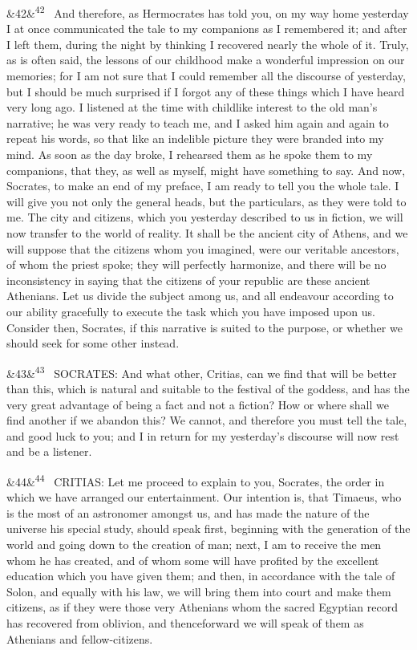 \documentclass[12pt]{article}
\newcommand{\para}[1][]{\par\noindent\ifx&#1&\else\textsuperscript{\footnotesize #1}~\fi}
\begin{document}
\para[42] And therefore, as Hermocrates has told you, on my way home yesterday I at once communicated the tale to my companions as I remembered it; and after I left them, during the night by thinking I recovered nearly the whole of it. Truly, as is often said, the lessons of our childhood make a wonderful impression on our memories; for I am not sure that I could remember all the discourse of yesterday, but I should be much surprised if I forgot any of these things which I have heard very long ago. I listened at the time with childlike interest to the old man's narrative; he was very ready to teach me, and I asked him again and again to repeat his words, so that like an indelible picture they were branded into my mind. As soon as the day broke, I rehearsed them as he spoke them to my companions, that they, as well as myself, might have something to say. And now, Socrates, to make an end of my preface, I am ready to tell you the whole tale. I will give you not only the general heads, but the particulars, as they were told to me. The city and citizens, which you yesterday described to us in fiction, we will now transfer to the world of reality. It shall be the ancient city of Athens, and we will suppose that the citizens whom you imagined, were our veritable ancestors, of whom the priest spoke; they will perfectly harmonize, and there will be no inconsistency in saying that the citizens of your republic are these ancient Athenians. Let us divide the subject among us, and all endeavour according to our ability gracefully to execute the task which you have imposed upon us. Consider then, Socrates, if this narrative is suited to the purpose, or whether we should seek for some other instead.

\para[43] SOCRATES: And what other, Critias, can we find that will be better than this, which is natural and suitable to the festival of the goddess, and has the very great advantage of being a fact and not a fiction? How or where shall we find another if we abandon this? We cannot, and therefore you must tell the tale, and good luck to you; and I in return for my yesterday's discourse will now rest and be a listener.

\para[44] CRITIAS: Let me proceed to explain to you, Socrates, the order in which we have arranged our entertainment. Our intention is, that Timaeus, who is the most of an astronomer amongst us, and has made the nature of the universe his special study, should speak first, beginning with the generation of the world and going down to the creation of man; next, I am to receive the men whom he has created, and of whom some will have profited by the excellent education which you have given them; and then, in accordance with the tale of Solon, and equally with his law, we will bring them into court and make them citizens, as if they were those very Athenians whom the sacred Egyptian record has recovered from oblivion, and thenceforward we will speak of them as Athenians and fellow-citizens.
\end{document}
